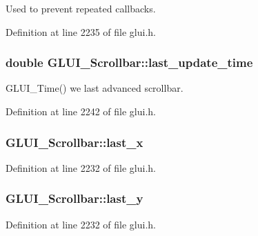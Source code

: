 Used to prevent repeated callbacks. 



Definition at line 2235 of file glui.\+h.

\hypertarget{class_g_l_u_i___scrollbar_a413909d1d5c47657e963fb2ce30e2456}{
\subsubsection[{last\+\_\+update\+\_\+time}]{\setlength{\rightskip}{0pt plus 5cm}double G\+L\+U\+I\+\_\+\+Scrollbar\+::last\+\_\+update\+\_\+time}}\label{class_g_l_u_i___scrollbar_a413909d1d5c47657e963fb2ce30e2456}


G\+L\+U\+I\+\_\+\+Time() we last advanced scrollbar. 



Definition at line 2242 of file glui.\+h.

\hypertarget{class_g_l_u_i___scrollbar_a90351bf785037ab1f13c20724065d369}{
\subsubsection[{last\+\_\+x}]{ G\+L\+U\+I\+\_\+\+Scrollbar\+::last\+\_\+x}}\label{class_g_l_u_i___scrollbar_a90351bf785037ab1f13c20724065d369}


Definition at line 2232 of file glui.\+h.

\hypertarget{class_g_l_u_i___scrollbar_a68785c6cf9be6f321b77b6d9104fd8d9}{
\subsubsection[{last\+\_\+y}]{ G\+L\+U\+I\+\_\+\+Scrollbar\+::last\+\_\+y}}\label{class_g_l_u_i___scrollbar_a68785c6cf9be6f321b77b6d9104fd8d9}


Definition at line 2232 of file glui.\+h.

